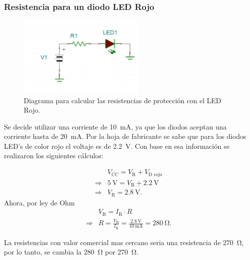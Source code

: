 \subsubsection{Resistencia para un diodo LED Rojo}

\begin{figure}[H]
\centering
\includegraphics[width=0.55\textwidth]{Imagenes/Resistencia_LED_Rojo.jpg} 
\caption{Diagrama para calcular las resistencias de protección con el LED Rojo.}
\label{Fig: Diagrama 1}
\end{figure}

Se decide utilizar una corriente de \SI{10}{\milli\ampere}, ya que los diodos aceptan una corriente hasta de \SI{20}{\milli\ampere}. Por la hoja de fabricante se sabe que para los diodos LED's de color rojo el voltaje es de \SI{2.2}{\volt}. Con base en esa información se realizaron los siguientes cálculos: 

\begin{align}
    & V_{CC} = V_\text{R} + V_\text{D rojo}\\
    \Rightarrow& \SI{5}{\volt} = V_\text{R} + \SI{2.2}{\volt}\nonumber\\
    \Rightarrow& V_\text{R} = \SI{2.8}{\volt}.\nonumber
\end{align}
Ahora, por ley de Ohm
\begin{align}
    & V_\text{R} = I_\text{R} \cdot R\\
    \Rightarrow& R = \frac{V_\text{R}}{I_\text{R}} = \frac{\SI{2.8}{\volt}}{\SI{10}{\milli\ampere}} = \SI{280}{\ohm}. \nonumber
\end{align}

La resistencias con valor comercial mas cercano seria una resistencia de \SI{270}{\ohm}, por lo tanto, se cambia la \SI{280}{\ohm} por \SI{270}{\ohm}.


